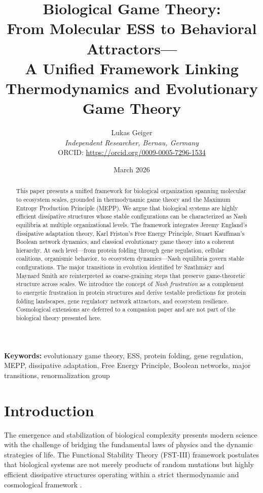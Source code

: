 \documentclass[12pt,a4paper]{article}
\title{Biological Game Theory:\\
From Molecular ESS to Behavioral Attractors---\\
A Unified Framework Linking Thermodynamics and Evolutionary Game Theory}
\author{Lukas Geiger\\
\textit{Independent Researcher, Bernau, Germany}\\
ORCID: \url{https://orcid.org/0009-0005-7296-1534}}
\date{March 2026}
\theoremstyle{remark}
\begin{document}
\maketitle

\begin{abstract}
This paper presents a unified framework for biological organization spanning molecular to ecosystem scales, grounded in thermodynamic game theory and the Maximum Entropy Production Principle (MEPP). We argue that biological systems are highly efficient dissipative structures whose stable configurations can be characterized as Nash equilibria at multiple organizational levels. The framework integrates Jeremy England's dissipative adaptation theory, Karl Friston's Free Energy Principle, Stuart Kauffman's Boolean network dynamics, and classical evolutionary game theory into a coherent hierarchy. At each level---from protein folding through gene regulation, cellular coalitions, organismic behavior, to ecosystem dynamics---Nash equilibria govern stable configurations. The major transitions in evolution identified by Szathm\'ary and Maynard Smith are reinterpreted as coarse-graining steps that preserve game-theoretic structure across scales. We introduce the concept of \emph{Nash frustration} as a complement to energetic frustration in protein structures and derive testable predictions for protein folding landscapes, gene regulatory network attractors, and ecosystem resilience. Cosmological extensions are deferred to a companion paper and are not part of the biological theory presented here.
\end{abstract}

\textbf{Keywords:} evolutionary game theory, ESS, protein folding, gene regulation, MEPP, dissipative adaptation, Free Energy Principle, Boolean networks, major transitions, renormalization group

\section{Introduction}
\label{sec:introduction}

The emergence and stabilization of biological complexity presents modern science with the challenge of bridging the fundamental laws of physics and the dynamic strategies of life. The Functional Stability Theory (FST-III) framework postulates that biological systems are not merely products of random mutations but highly efficient dissipative structures operating within a strict thermodynamic and cosmological framework \citep{EcosystemMEPP}.
\end{document}
